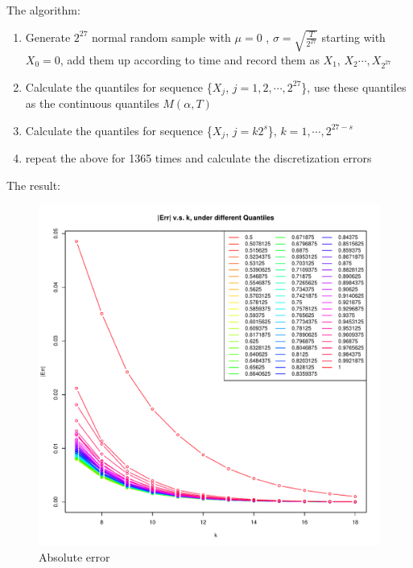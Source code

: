 \documentclass[12pt,oneside,titlepage]{book}
\begin{document}
The algorithm: 
\begin{enumerate}[1.]
\item Generate $2^{27}$ normal random sample with $\mu =0$ , $\sigma = \sqrt {\frac{T}{2^27}}$  starting with $X_0 = 0$, add them up according to time and record them as $X_1$, $X_2 \cdots, X_{2^{27}}$
\item Calculate the quantiles for sequence \{$X_j$, $j=1, 2, \cdots, 2^{27}$\}, use these quantiles as the continuous quantiles $M(\alpha , T)$
\item Calculate the quantiles for sequence \{$X_j$, $j=k2^s$\}, $k=1, \cdots, 2^{27-s}$
\item repeat the above for 1365 times and calculate the discretization errors
\end{enumerate}
The result: 
\begin{figure}[htbp]
   \centering
   \includegraphics{nout_7_27_lines.pdf} %
   \caption{Absolute error }
\end{figure}
 
\end{document}
